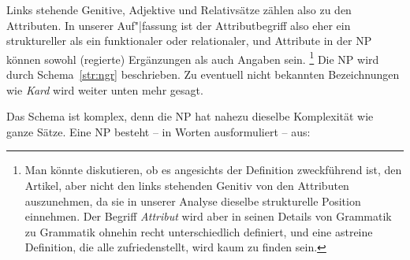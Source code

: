 
Links stehende Genitive, Adjektive und Relativsätze zählen also zu den Attributen.
In unserer Auf"|fassung ist der Attributbegriff also eher ein struktureller als ein funktionaler oder relationaler, und Attribute in der NP können sowohl (regierte) Ergänzungen als auch Angaben sein.%
\footnote{Man könnte diskutieren, ob es angesichts der Definition zweckführend ist, den Artikel, aber nicht den links stehenden Genitiv von den Attributen auszunehmen, da sie in unserer Analyse dieselbe strukturelle Position einnehmen.
Der Begriff \textit{Attribut} wird aber in seinen Details von Grammatik zu Grammatik ohnehin recht unterschiedlich definiert, und eine astreine Definition, die alle zufriedenstellt, wird kaum zu finden sein.}
Die NP wird durch Schema~\ref{str:ngr} beschrieben.
Zu eventuell nicht bekannten Bezeichnungen wie \textit{Kard} wird weiter unten mehr gesagt.



Das Schema ist komplex, denn die NP hat nahezu dieselbe Komplexität wie ganze Sätze.
Eine NP besteht -- in Worten ausformuliert -- aus:


